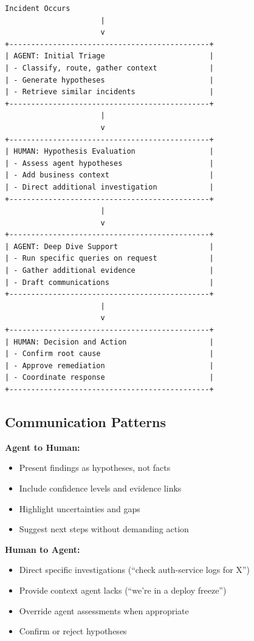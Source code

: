 \begin{lstlisting}[caption={Human-Agent Collaboration Flow}]
                Incident Occurs
                      |
                      v
+----------------------------------------------+
| AGENT: Initial Triage                        |
| - Classify, route, gather context            |
| - Generate hypotheses                        |
| - Retrieve similar incidents                 |
+----------------------------------------------+
                      |
                      v
+----------------------------------------------+
| HUMAN: Hypothesis Evaluation                 |
| - Assess agent hypotheses                    |
| - Add business context                       |
| - Direct additional investigation            |
+----------------------------------------------+
                      |
                      v
+----------------------------------------------+
| AGENT: Deep Dive Support                     |
| - Run specific queries on request            |
| - Gather additional evidence                 |
| - Draft communications                       |
+----------------------------------------------+
                      |
                      v
+----------------------------------------------+
| HUMAN: Decision and Action                   |
| - Confirm root cause                         |
| - Approve remediation                        |
| - Coordinate response                        |
+----------------------------------------------+
\end{lstlisting}

\subsection{Communication Patterns}
\label{subsec:communication-patterns}

\textbf{Agent to Human:}
\begin{itemize}
    \item Present findings as hypotheses, not facts
    \item Include confidence levels and evidence links
    \item Highlight uncertainties and gaps
    \item Suggest next steps without demanding action
\end{itemize}

\textbf{Human to Agent:}
\begin{itemize}
    \item Direct specific investigations (``check auth-service logs for X'')
    \item Provide context agent lacks (``we're in a deploy freeze'')
    \item Override agent assessments when appropriate
    \item Confirm or reject hypotheses
\end{itemize}

